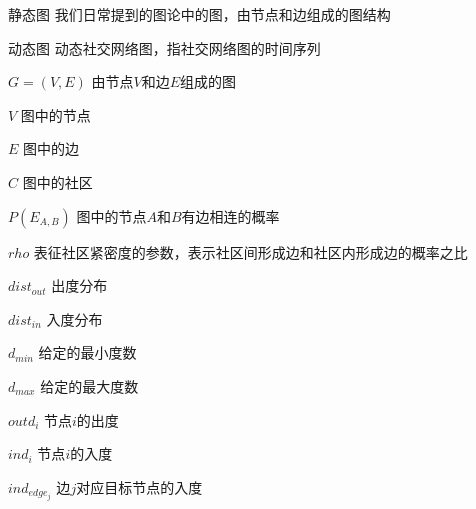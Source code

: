 
\begin{denotation}[3cm]
\item[静态图] 我们日常提到的图论中的图，由节点和边组成的图结构
\item[动态图] 动态社交网络图，指社交网络图的时间序列
\item[$G=(V,E)$] 由节点$V$和边$E$组成的图
\item[$V$] 图中的节点
\item[$E$] 图中的边
\item[$C$] 图中的社区
\item[$P\left(E_{A,B}\right)$] 图中的节点$A$和$B$有边相连的概率
\item[$rho$] 表征社区紧密度的参数，表示社区间形成边和社区内形成边的概率之比
\item[$dist_{out}$] 出度分布
\item[$dist_{in}$] 入度分布
\item[$d_{min}$] 给定的最小度数
\item[$d_{max}$] 给定的最大度数
\item[$outd_i$] 节点$i$的出度
\item[$ind_i$] 节点$i$的入度
\item[$ind_{edge_j}$] 边$j$对应目标节点的入度
\end{denotation}
